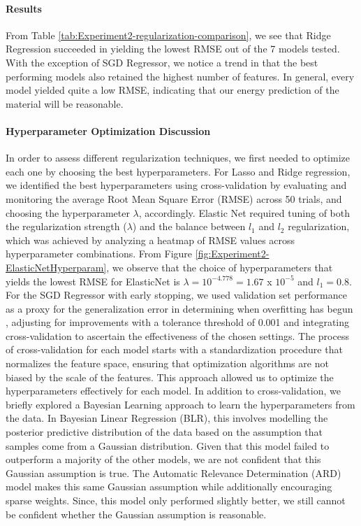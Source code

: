 \documentclass{article}
\let\citep\parencite   %
\begin{document}
\paragraph{Results}
From Table \ref{tab:Experiment2-regularization-comparison}, we see that Ridge Regression succeeded in yielding the lowest RMSE out of the 7 models tested. With the exception of SGD Regressor, we notice a trend in that the best performing models also retained the highest number of features.  In general, every model yielded quite a low RMSE, indicating that our energy prediction of the material will be reasonable. 

\paragraph{Hyperparameter Optimization Discussion}
In order to assess different regularization techniques, we first needed to optimize each one by choosing the best hyperparameters. For Lasso and Ridge regression, we identified the best hyperparameters using cross-validation by evaluating and monitoring the average Root Mean Square Error (RMSE) across 50 trials, and choosing the hyperparameter $\lambda$, accordingly. Elastic Net required tuning of both the regularization strength ($\lambda$) and the balance between $l_1$ and $l_2$ regularization, which was achieved by analyzing a heatmap of RMSE values across hyperparameter combinations. From Figure \ref{fig:Experiment2-ElasticNetHyperparam}, we observe that the choice of hyperparameters that yields the lowest RMSE for ElasticNet is $\lambda=10^{-4.778}=1.67$ x $10^{-5}$ and $l_1 =0.8$. For the SGD Regressor with early stopping, we used validation set performance as a proxy for the generalization error in determining when overfitting has begun \citep{EarlyStopping}, adjusting for improvements with a tolerance threshold of 0.001 and integrating cross-validation to ascertain the effectiveness of the chosen settings. 
The process of cross-validation for each model starts with a standardization procedure that normalizes the feature space, ensuring that optimization algorithms are not biased by the scale of the features. This approach allowed us to optimize the hyperparameters effectively for each model. 
In addition to cross-validation, we briefly explored a Bayesian Learning approach to learn the hyperparameters from the data. In Bayesian Linear Regression (BLR), this involves modelling the posterior predictive distribution of the data based on the assumption that samples come from a Gaussian distribution. Given that this model failed to outperform a majority of the other  models, we are not confident that this Gaussian assumption is true. The Automatic Relevance Determination (ARD) model makes this same Gaussian assumption while additionally encouraging sparse weights. Since, this model only performed slightly better, we still cannot be confident whether the Gaussian assumption is reasonable. \\
\end{document}
